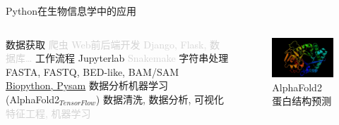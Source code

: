 \begin{frame}{Python在生物信息学中的应用}
    \begin{columns}
        \begin{myoutline}[itemize]
            \1 数据获取
                \2 \textcolor{lightgray}{爬虫}
            \1 \textcolor{lightgray}{Web前后端开发}
                \2 \textcolor{lightgray}{Django, Flask, 数据库\dots}
            \1 工作流程
                \2 Jupyterlab
                \2 \textcolor{lightgray}{Snakemake}
            \1 字符串处理
                \2 FASTA, FASTQ, BED-like, BAM/SAM
                \2 \underline{Biopython, Pysam}
            \1 数据分析机器学习 \\ (AlphaFold2$_{TensorFlow}$)
                \2 数据清洗, 数据分析, 可视化
                \2 \textcolor{lightgray}{特征工程, 机器学习}
        \end{myoutline}
        \begin{figure}
            \centering
            \includegraphics[width=8cm]{Images/alphafold.jpg}
            \caption{AlphaFold2 蛋白结构预测}
        \end{figure}
    \end{columns}
\end{frame}


